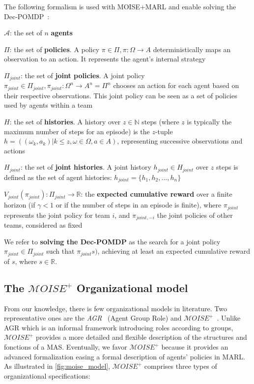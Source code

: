 \documentclass[sigconf,anonymous]{aamas}
\begin{document}
The following formalism is used with MOISE+MARL and enable solving the Dec-POMDP~\citep{Beynier2013,Albrecht2024}:
%
\begin{itemize*}[label={},itemjoin={; \quad}]
    \item $\mathcal{A}$: the set of $n$ \textbf{agents}
    \item $\Pi$: the set of \textbf{policies}. A policy $\pi \in \Pi, \pi: \Omega \rightarrow A$ deterministically maps an observation to an action. It represents the agent's internal strategy
    \item $\Pi_{joint}$: the set of \textbf{joint policies}. A joint policy $\pi_{joint} \in \Pi_{joint}, \pi_{joint}: \Omega^n \rightarrow A^n = \Pi^n$ chooses an action for each agent based on their respective observations. This joint policy can be seen as a set of policies used by agents within a team
    \item $H$: the set of \textbf{histories}. A history over $z \in \mathbb{N}$ steps (where $z$ is typically the maximum number of steps for an episode) is the $z$-tuple $h = ((\omega_{k}, a_{k}) | k \leq z, \omega \in \Omega, a \in A)$, representing successive observations and actions
    \item $H_{joint}$: the set of \textbf{joint histories}. A joint history $h_{joint} \in H_{joint}$ over $z$ steps is defined as the set of agent histories: $h_{joint} = \{h_1, h_2, ..., h_n\}$
    \item $V_{joint}(\pi_{joint}): \Pi_{joint} \rightarrow \mathbb{R}$: the \textbf{expected cumulative reward} over a finite horizon (if $\gamma < 1$ or if the number of steps in an episode is finite), where $\pi_{joint}$ represents the joint policy for team $i$, and $\pi_{joint,-i}$ the joint policies of other teams, considered as fixed
\end{itemize*}

We refer to \textbf{solving the Dec-POMDP} as the search for a joint policy $\pi_{joint} \in \Pi_{joint}$ such that $\pi_{joint}s)$, achieving at least an expected cumulative reward of $s$, where $s \in \mathbb{R}$.



\subsection{The $\mathcal{M}OISE^+$ Organizational model}

From our knowledge, there is few organizational models in literature. Two representative ones are the \textit{AGR}~\cite{ferber2003} (Agent Group Role) and $\mathcal{M}OISE^+$~\citep{Hubner2007}. Unlike AGR which is an informal framework introducing roles according to groups, $\mathcal{M}OISE^+$ provides a more detailed and flexible description of the structures and fonctions of a MAS. Eventually, we favor $\mathcal{M}OISE^+$ because it provides an advanced formalization easing a formal description of agents' policies in MARL.
As illustrated in \ref{fig:moise_model}, $\mathcal{M}OISE^+$ comprises three types of organizational specifications:
\end{document}
